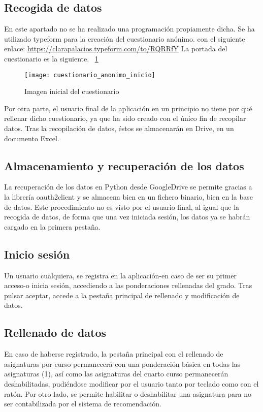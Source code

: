 \subsection{Recogida de datos}
En este apartado no se ha realizado una programación propiamente dicha. Se ha utilizado typeform para la creación del cuestionario anónimo. con el siguiente enlace: \url{https://clarapalacios.typeform.com/to/RQRRfY}
La portada del cuestionario es la siguiente. 
~\ref{fig:D.1.1}
\begin{figure}[h]
\centering
\texttt{[image: cuestionario\_anonimo\_inicio]}
\caption{Imagen inicial del cuestionario}
\label{fig:D.1.1}
\end{figure}
Por otra parte, el usuario final de la aplicación en un principio no tiene por qué rellenar dicho cuestionario, ya que ha sido creado con el único fin de recopilar datos. 
Tras la recopilación de datos, éstos se almacenarán en Drive, en un documento Excel. 
\subsection{Almacenamiento y recuperación de los datos}
La recuperación de los datos en Python desde GoogleDrive se permite gracias a la librería oauth2client y se almacena bien en un fichero binario, bien en la base de datos. 
Este procedimiento no es visto por el usuario final, al igual que la recogida de datos, de forma que una vez iniciada sesión, los datos ya se habrán cargado en la primera pestaña. 

\subsection{Inicio sesión}
Un usuario cualquiera, se registra en la aplicación-en caso de ser su primer acceso-o inicia sesión, accediendo a las ponderaciones rellenadas del grado.  Tras pulsar aceptar, accede a la pestaña principal de rellenado y modificación de datos.

\subsection{Rellenado de datos}
En caso de haberse registrado, la pestaña principal con el rellenado de asignaturas por curso permanecerá con una ponderación básica en todas las asignaturas (1), así como las asignaturas del cuarto curso permanecerán deshabilitadas, pudiéndose modificar por el usuario tanto por teclado como con el ratón. Por otro lado, se permite habilitar o deshabilitar una asignatura para no ser contabilizada por el sistema de recomendación.  
 
